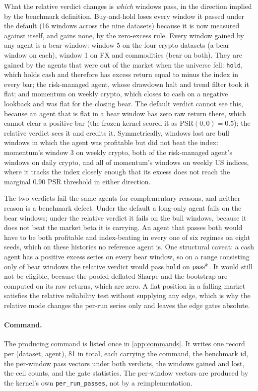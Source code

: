 What the relative verdict changes is \emph{which} windows pass, in the direction implied by the benchmark definition. Buy-and-hold loses every window it passed under the default (16 windows across the nine datasets) because it is now measured against itself, and gains none, by the zero-excess rule. Every window gained by any agent is a bear window: window 5 on the four crypto datasets (a bear window on each), window 1 on FX and commodities (bear on both). They are gained by the agents that were out of the market when the universe fell: \texttt{hold}, which holds cash and therefore has excess return equal to minus the index in every bar; the risk-managed agent, whose drawdown halt and trend filter took it flat; and momentum on weekly crypto, which closes to cash on a negative lookback and was flat for the closing bear. The default verdict cannot see this, because an agent that is flat in a bear window has zero raw return there, which cannot clear a positive bar (the frozen kernel scored it as $\text{PSR}(0, 0) = 0.5$); the relative verdict sees it and credits it. Symmetrically, windows lost are bull windows in which the agent was profitable but did not beat the index: momentum's window 3 on weekly crypto, both of the risk-managed agent's windows on daily crypto, and all of momentum's windows on weekly US indices, where it tracks the index closely enough that its excess does not reach the marginal $0.90$ PSR threshold in either direction.

The two verdicts fail the same agents for complementary reasons, and neither reason is a benchmark defect. Under the default a long-only agent fails on the bear windows; under the relative verdict it fails on the bull windows, because it does not beat the market beta it is carrying. An agent that passes both would have to be both profitable and index-beating in every one of six regimes on eight seeds, which on these histories no reference agent is. One structural caveat: a cash agent has a positive excess series on every bear window, so on a range consisting only of bear windows the relative verdict would pass \texttt{hold} on $\text{pass}^{k}$. It would still not be eligible, because the pooled deflated Sharpe and the bootstrap are computed on its raw returns, which are zero. A flat position in a falling market satisfies the relative reliability test without supplying any edge, which is why the relative mode changes the per-run series only and leaves the edge gates absolute.

\paragraph{Command.} The producing command is listed once in \cref{app:commands}. It writes one record per (dataset, agent), 81 in total, each carrying the command, the benchmark id, the per-window pass vectors under both verdicts, the windows gained and lost, the cell counts, and the gate statistics. The per-window vectors are produced by the kernel's own \texttt{per\_run\_passes}, not by a reimplementation.

